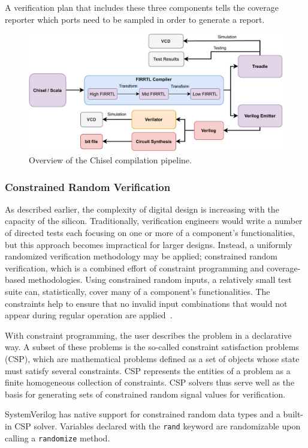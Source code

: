 \documentclass[conference]{IEEEtran}
\begin{document}
A verification plan that includes these three components tells the coverage reporter which ports need to be sampled in order to generate a report.

\begin{figure}
  \centering
    \includegraphics[width=0.8\linewidth]{Chisel_FIRRTL_VERILOG.pdf}
    \caption{Overview of the Chisel compilation pipeline.}
\label{fig:chisel-pipe}
\end{figure}


\subsubsection{Constrained Random Verification}
As described earlier, the complexity of digital design is increasing with the capacity of the silicon. Traditionally, verification engineers would write a number of directed tests each focusing on one or more of a component's functionalities, but this approach becomes impractical for larger designs. Instead, a uniformly randomized verification methodology may be applied; constrained random verification, which is a combined effort of constraint programming and coverage-based methodologies.
Using constrained random inputs, a relatively small test suite can, statistically, cover many of a component's functionalities. 
The constraints help to ensure that no invalid input combinations that would not appear during regular operation are applied~\cite{MehtaCRV2018}.

With constraint programming, the user describes the problem in a declarative way. A subset of these problems is the so-called constraint satisfaction problems (CSP), which are mathematical problems defined as a set of objects whose state must satisfy several constraints. CSP represents the entities of a problem as a finite homogeneous collection of constraints. CSP solvers thus serve well as the basis for generating sets of constrained random signal values for verification.

SystemVerilog has native support for constrained random data types and a built-in CSP solver. Variables declared with the \texttt{rand} keyword are randomizable upon calling a \texttt{randomize} method.
\end{document}
